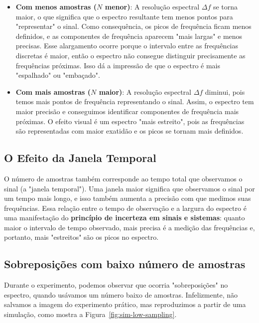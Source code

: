 \begin{itemize}
    \item \textbf{Com menos amostras ($N$ menor)}: A resolução espectral $\Delta f$ se torna maior, o que significa que o espectro resultante tem menos pontos para "representar" o sinal. Como consequência, os picos de frequência ficam menos definidos, e as componentes de frequência aparecem "mais largas" e menos precisas. Esse alargamento ocorre porque o intervalo entre as frequências discretas é maior, então o espectro não consegue distinguir precisamente as frequências próximas. Isso dá a impressão de que o espectro é mais "espalhado" ou "embaçado".

    \item \textbf{Com mais amostras ($N$ maior)}: A resolução espectral $\Delta f$ diminui, pois temos mais pontos de frequência representando o sinal. Assim, o espectro tem maior precisão e conseguimos identificar componentes de frequência mais próximas. O efeito visual é um espectro "mais estreito", pois as frequências são representadas com maior exatidão e os picos se tornam mais definidos.
\end{itemize}

\subsection*{O Efeito da Janela Temporal}

O número de amostras também corresponde ao tempo total que observamos o sinal (a "janela temporal"). Uma janela maior significa que observamos o sinal por um tempo mais longo, e isso também aumenta a precisão com que medimos suas frequências. Essa relação entre o tempo de observação e a largura do espectro é uma manifestação do \textbf{princípio de incerteza em sinais e sistemas}: quanto maior o intervalo de tempo observado, mais precisa é a medição das frequências e, portanto, mais "estreitos" são os picos no espectro.

\subsection*{Sobreposições com baixo número de amostras}

Durante o experimento, podemos observar que ocorria "sobreposições" no espectro, quando usávamos um número baixo de amostras. Infelizmente, não salvamos a imagem do experimento prático, mas reproduzimos a partir de uma simulação, como mostra a Figura~\ref{fig:sim-low-sampling}.


